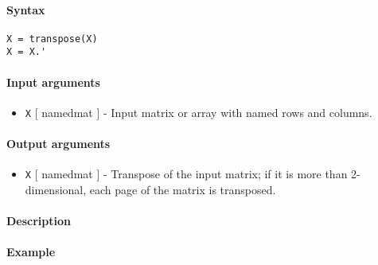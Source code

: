 


	\paragraph{Syntax}\label{syntax}

\begin{verbatim}
X = transpose(X)
X = X.'
\end{verbatim}

\paragraph{Input arguments}\label{input-arguments}

\begin{itemize}
\itemsep1pt\parskip0pt
\item
  \texttt{X} {[} namedmat {]} - Input matrix or array with named rows
  and columns.
\end{itemize}

\paragraph{Output arguments}\label{output-arguments}

\begin{itemize}
\itemsep1pt\parskip0pt
\item
  \texttt{X} {[} namedmat {]} - Transpose of the input matrix; if it is
  more than 2-dimensional, each page of the matrix is transposed.
\end{itemize}

\paragraph{Description}\label{description}

\paragraph{Example}\label{example}


